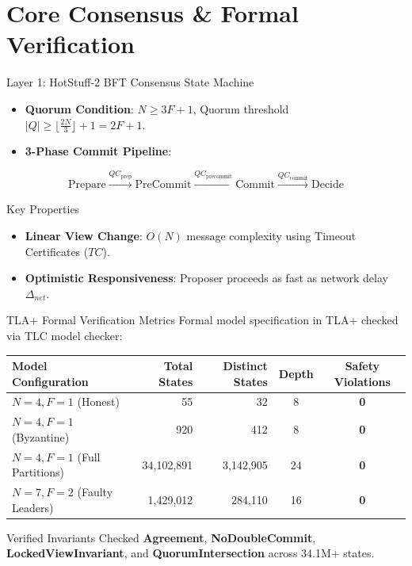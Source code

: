 \documentclass[10pt]{beamer}
\begin{document}
\section{Core Consensus \& Formal Verification}

\begin{frame}{Layer 1: HotStuff-2 BFT Consensus State Machine}
  \begin{itemize}
    \item \textbf{Quorum Condition}: $N \ge 3F + 1$, Quorum threshold $|Q| \ge \lfloor \frac{2N}{3} \rfloor + 1 = 2F+1$.
    \item \textbf{3-Phase Commit Pipeline}:
  \end{itemize}
  $$\text{Prepare} \xrightarrow{QC_{\text{prep}}} \text{PreCommit} \xrightarrow{QC_{\text{precommit}}} \text{Commit} \xrightarrow{QC_{\text{commit}}} \text{Decide}$$
  
  \begin{block}{Key Properties}
    \begin{itemize}
      \item \textbf{Linear View Change}: $O(N)$ message complexity using Timeout Certificates ($TC$).
      \item \textbf{Optimistic Responsiveness}: Proposer proceeds as fast as network delay $\Delta_{net}$.
    \end{itemize}
  \end{block}
\end{frame}

\begin{frame}{TLA+ Formal Verification Metrics}
  Formal model specification in TLA+ checked via TLC model checker:
  \vspace{0.2cm}
  \begin{table}
    \centering
    \scriptsize
    \begin{tabular}{lrrcc}
      \toprule
      \textbf{Model Configuration} & \textbf{Total States} & \textbf{Distinct States} & \textbf{Depth} & \textbf{Safety Violations} \\
      \midrule
      $N=4, F=1$ (Honest) & 55 & 32 & 8 & \textbf{0} \\
      $N=4, F=1$ (Byzantine) & 920 & 412 & 8 & \textbf{0} \\
      $N=4, F=1$ (Full Partitions) & 34,102,891 & 3,142,905 & 24 & \textbf{0} \\
      $N=7, F=2$ (Faulty Leaders) & 1,429,012 & 284,110 & 16 & \textbf{0} \\
      \bottomrule
    \end{tabular}
  \end{table}
  \vspace{0.2cm}
  \begin{alertblock}{Verified Invariants}
    Checked \textbf{Agreement}, \textbf{NoDoubleCommit}, \textbf{LockedViewInvariant}, and \textbf{QuorumIntersection} across 34.1M+ states.
  \end{alertblock}
\end{frame}
\end{document}
